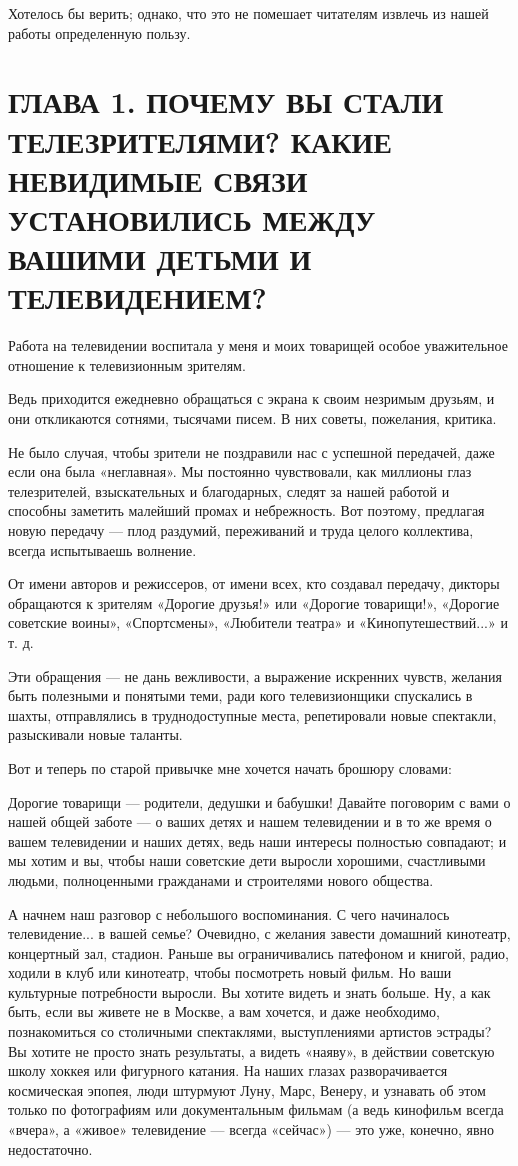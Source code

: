\documentclass[12pt, a4paper, openany]{book}
\begin{document}
Хотелось бы верить; однако, что это не помешает читателям извлечь из нашей работы определенную пользу. 
\newpage

	\section[Глава первая. Почему вы стали телезрителями? Какие невидимые связи установились между вашими детьми и телевидением?]{\center \textbf{ГЛАВА 1. ПОЧЕМУ ВЫ СТАЛИ ТЕЛЕЗРИТЕЛЯМИ? КАКИЕ НЕВИДИМЫЕ СВЯЗИ УСТАНОВИЛИСЬ МЕЖДУ ВАШИМИ ДЕТЬМИ И ТЕЛЕВИДЕНИЕМ? }}

Работа на телевидении воспитала у меня и моих товарищей особое уважительное отношение к телевизионным зрителям. 

Ведь приходится ежедневно обращаться с экрана к своим незримым друзьям, и они откликаются сотнями, тысячами писем. В них советы, пожелания, критика. 

Не было случая, чтобы зрители не поздравили нас с успешной передачей, даже если она была «неглавная». Мы постоянно чувствовали, как миллионы глаз телезрителей, взыскательных и благодарных, следят за нашей работой и способны заметить малейший промах и небрежность. Вот поэтому, предлагая новую передачу — плод раздумий, переживаний и труда целого коллектива, всегда испытываешь волнение. 

От имени авторов и режиссеров, от имени всех, кто создавал передачу, дикторы обращаются к зрителям «Дорогие друзья!» или «Дорогие товарищи!», «Дорогие советские воины», «Спортсмены», «Любители театра» и «Кинопутешествий...» и т. д. 

Эти обращения — не дань вежливости, а выражение искренних чувств, желания быть полезными и понятыми теми, ради кого телевизионщики спускались в шахты, отправлялись в труднодоступные места, репетировали новые спектакли, разыскивали новые таланты. 

Вот и теперь по старой привычке мне хочется начать брошюру словами: 

Дорогие товарищи — родители, дедушки и бабушки! Давайте поговорим с вами о нашей общей заботе — о ваших детях и нашем телевидении и в то же время о вашем телевидении и наших детях, ведь наши интересы полностью совпадают; и мы хотим и вы, чтобы наши советские дети выросли хорошими, счастливыми людьми, полноценными гражданами и строителями нового общества. 

А начнем наш разговор с небольшого воспоминания. С чего начиналось телевидение... в вашей семье? Очевидно, с желания завести домашний кинотеатр, концертный зал, стадион. Раньше вы ограничивались патефоном и книгой, радио, ходили в клуб или кинотеатр, чтобы посмотреть новый фильм. Но ваши культурные потребности выросли. Вы хотите видеть и знать больше. Ну, а как быть, если вы живете не в Москве, а вам хочется, и даже необходимо, познакомиться со столичными спектаклями, выступлениями артистов эстрады? Вы хотите не просто знать результаты, а видеть «наяву», в действии советскую школу хоккея или фигурного катания. На наших глазах разворачивается космическая эпопея, люди штурмуют Луну, Марс, Венеру, и узнавать об этом только по фотографиям или документальным фильмам (а ведь кинофильм всегда «вчера», а «живое» телевидение — всегда «сейчас») — это уже, конечно, явно недостаточно. 
\end{document}
